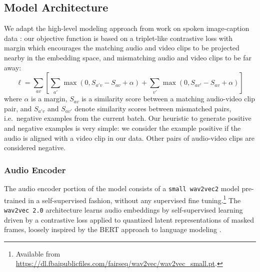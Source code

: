 \subsection{Model Architecture}
\label{sec:model}
We adapt the high-level modeling approach from work on spoken
image-caption data
\citep{harwath2016unsupervised,chrupala-etal-2017-representations}:
our objective function is based on a triplet-like contrastive loss with margin which
encourages the matching audio and video clips to be projected nearby in
the embedding space, and mismatching audio and video clips to be far
away:
\begin{dmath}
  \ell = \sum_{av}\left[\sum_{a'} \max(0, S_{a'v} - S_{av} +
    \alpha) + \sum_{v'} \max(0, S_{av'} - S_{av} + \alpha) \right]
  \label{eq:triplet}
\end{dmath}
where $\alpha$ is a margin, $S_{av}$ is a similarity score between a
matching audio-video clip pair, and $S_{a'v}$ and $S_{av'}$ denote
similarity scores between mismatched pairs, i.e.\ negative examples
from the current batch. Our heuristic to generate positive and
negative examples is very simple: we consider the example
positive if the audio is aligned with a video clip in our
data. Other pairs of audio-video clips are considered negative.

\subsubsection{Audio Encoder}
The audio encoder portion of the model consists of a {\tt small
  wav2vec2} model \citep{wav2vec2} pre-trained in a self-supervised
fashion, without any supervised fine tuning.\footnote{Available from
  \url{https://dl.fbaipublicfiles.com/fairseq/wav2vec/wav2vec_small.pt}.}
The {\tt wav2vec 2.0} architecture learns audio embeddings by
self-supervised learning driven by a contrastive loss applied to 
quantized latent representations of masked frames, loosely inspired by
the BERT approach to language modeling \citep{devlin-etal-2019-bert}.

